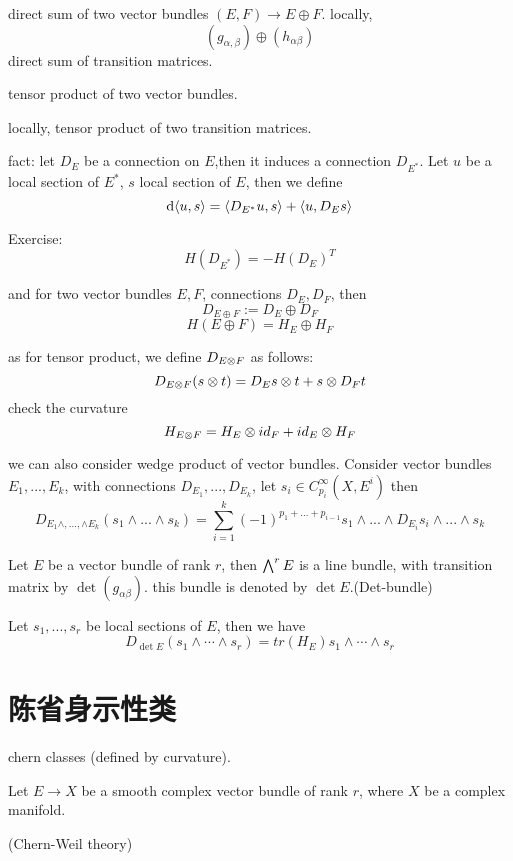 \begin{definition}
direct sum of two vector bundles $(E,F)\to E\oplus F$.
locally,
$$(g_{\alpha,\beta})\oplus(h_{\alpha\beta})$$
direct sum of transition matrices. 
\end{definition}

\begin{definition}
tensor product of two vector bundles.

locally, tensor product of two transition matrices.
\end{definition}

fact: let $D_E$ be a connection on $E$,then it induces a connection $D_{E^*}$.
Let $u$ be a local section of $E^*$, $s$ local section of $E$, 
then we define 
$$\mathrm{d}\langle u,s\rangle=\langle D_{E^*}u,s\rangle+\langle u,D_{E}s\rangle$$

Exercise:
$$H(D_{E^*})=-H(D_E)^T$$

and for two vector bundles $E,F$, connections $D_E,D_F$, then 
$$D_{E\oplus F}:=D_E\oplus D_F$$
$$H(E\oplus F)=H_E\oplus H_F$$

as for tensor product, 
we define $D_{E\otimes F}$ as follows:
$$D_{E\otimes F}(s\otimes t)=D_Es\otimes t+s\otimes D_Ft$$
check the curvature
$$H_{E\otimes F}=H_E\otimes id_F+id_E\otimes H_F$$

\begin{rem}
we can also consider wedge product of vector bundles.
Consider vector bundles $E_1,...,E_k$,
with connections $D_{E_1},...,D_{E_k}$,
let $s_i\in C_{p_i}^\infty(X,E^i)$
then 
$$D_{E_1\wedge,...,\wedge E_k}(s_1\wedge...\wedge s_k)
=\sum_{i=1}^k(-1)^{p_1+...+p_{i-1}}s_1
\wedge...\wedge D_{E_i}s_i\wedge...\wedge s_k$$
\end{rem}

Let $E$ be a vector bundle of rank $r$, 
then $\bigwedge\nolimits^{r}E$ is a line bundle, 
with transition matrix by $\det(g_{\alpha\beta})$.
this bundle is denoted by $\det E$.(Det-bundle)

Let $s_1,...,s_r$ be local sections of $E$, 
then we have 
$$D_{\det E}(s_1\wedge\cdots\wedge s_r)= tr(H_E)s_1\wedge\cdots\wedge s_r$$

\section{陈省身示性类}
chern classes (defined by curvature).

Let $E\to X$ be a smooth complex vector bundle of rank $r$, 
where $X$ be a complex manifold.

(Chern-Weil theory)

